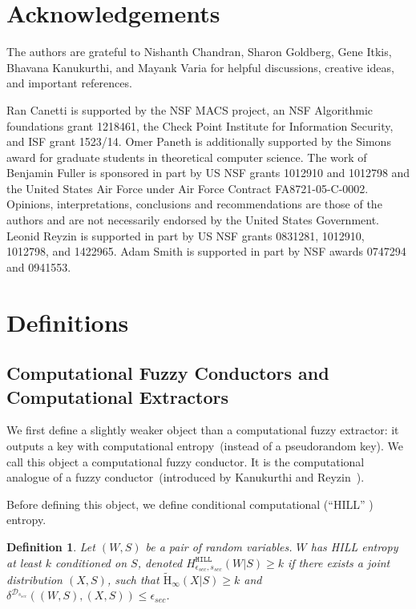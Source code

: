 \documentclass[11pt]{article}
\newtheorem{definition}[theorem]{Definition}
\newcommand{\hill}{\ensuremath{\mathtt{HILL}}\xspace}
\newcommand{\Hav}{\tilde{\mathrm{H}}_\infty}
\newcommand{\blind}[1]{{#1}}
\newcommand{\blind}[1]{}
\begin{document}
\blind{
\section*{Acknowledgements}
The authors are grateful to Nishanth Chandran, Sharon Goldberg, Gene Itkis, Bhavana Kanukurthi, and Mayank Varia for helpful discussions, creative ideas, and important references.

Ran Canetti is supported by the NSF MACS project, an NSF Algorithmic foundations grant 1218461, the Check Point Institute for Information Security, and  ISF grant 1523/14.
Omer Paneth is additionally supported by the Simons award for graduate students in theoretical computer science.
The work of Benjamin Fuller is sponsored in part by US NSF grants 1012910 and 1012798 and  the United States Air Force under Air Force Contract FA8721-05-C-0002. Opinions, interpretations, conclusions and recommendations are those of the authors and are not necessarily endorsed by the United States Government. 
Leonid Reyzin is supported in part by US NSF grants 0831281, 1012910, 1012798, and 1422965.  Adam Smith is supported in part by NSF awards 0747294 and 0941553. 
}



\appendix

\section{Definitions}
\subsection{Computational Fuzzy Conductors and Computational Extractors}
\label{sec:further defs}

We first define a slightly weaker object than a computational fuzzy extractor: it outputs a key with computational entropy~(instead of a pseudorandom key).  
We call this object a computational fuzzy conductor.  It is the computational analogue of a fuzzy conductor~(introduced by Kanukurthi and Reyzin~\cite{KanukurthiR09}).

Before defining this object, we define conditional computational (``HILL'' \cite{DBLP:journals/siamcomp/HastadILL99}) entropy.

\begin{definition}
\label{def:hill ent}
Let $(W, S)$ be a pair of random variables.  $W$ has
\emph{HILL entropy} at least $k$ conditioned on $S$,
denoted $H^{\hill}_{\epsilon_{sec}, s_{sec}}(W|S)\geq k$ if there exists a joint distribution $(X, S)$, such that $\Hav(X|S)\geq k$ and $\delta^{\mathcal{D}_{s_{sec}}} ((W, S), \allowbreak (X,S))\leq \epsilon_{sec}$.
\end{definition}
\end{document}

